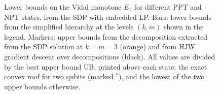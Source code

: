 %
\begin{figure}
  \centering
  \caption{Lower bounds on the Vidal monotone $E_1$ for different PPT and NPT states, from the SDP with embedded LP. Bars: lower bounds from the simplified hierarchy at the levels $(k,m)$ shown in the legend. Markers: upper bounds from the decomposition extracted from the SDP solution at $k=m=3$ (orange) and from HJW gradient descent over decompositions (black). All values are divided by the best upper bound UB, printed above each state: the exact convex roof for two qubits (marked $^*$), and the lowest of the two upper bounds otherwise.}
  \label{fig:Vidal}
\end{figure}
